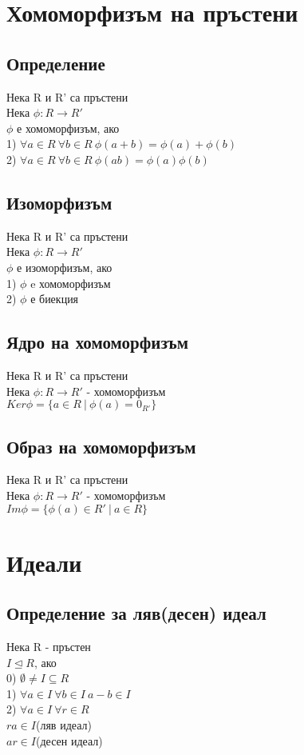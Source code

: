 \documentclass[12pt]{article}
\begin{document}
\pagebreak
\section{Хомоморфизъм на пръстени}

\subsection{Определение}
Нека R и R' са пръстени \\
Нека $\phi : R \rightarrow R'$ \\
$\phi$ е хомоморфизъм, ако \\
1) $\forall a \in R \ \forall b \in R \ \phi (a+b)=\phi (a)+ \phi (b)$\\
2) $\forall a \in R \ \forall b \in R \ \phi (ab)=\phi (a) \phi (b)$

\subsection{Изоморфизъм}
Нека R и R' са пръстени \\
Нека $\phi : R \rightarrow R'$\\
$\phi$ е изоморфизъм, ако\\
1) $\phi$ e хомоморфизъм \\
2) $\phi$ е биекция \\

\subsection{Ядро на хомоморфизъм}
Нека R и R' са пръстени \\
Нека $\phi : R \rightarrow R'$ - хомоморфизъм\\
$Ker \phi = \{a \in R \ \vert \ \phi (a) = 0_{R'}\}$

\subsection{Образ на хомоморфизъм}
Нека R и R' са пръстени \\
Нека $\phi : R \rightarrow R'$ - хомоморфизъм\\
$Im \phi = \{ \phi (a) \in R' \ \vert \ a \in R \}$

\clearpage
\section{Идеали}

\subsection{Определение за ляв(десен) идеал}
Нека R - пръстен \\
$I \trianglelefteq R$, ако \\
0) $\emptyset \neq I \subseteq R$ \\
1) $\forall a \in I \ \forall b \in I \ a-b \in I$ \\
2) $\forall a \in I \ \forall r \in R$ \\
$ra \in I $(ляв идеал) \\
$ar \in I $(десен идеал) \\
\end{document}
